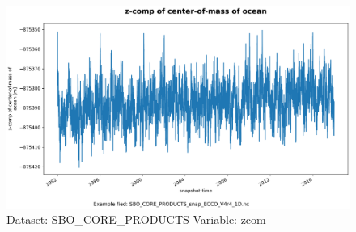 \begin{figure}[H]
\centering
\includegraphics[width=\textwidth]{../images/plots/oneD_plots/SBO_Core_Products/zcom.png}
\caption{Dataset: SBO\_CORE\_PRODUCTS Variable: zcom}
\label{tab:table-SBO_CORE_PRODUCTS_zcom-Plot}
\end{figure}
\pagebreak
